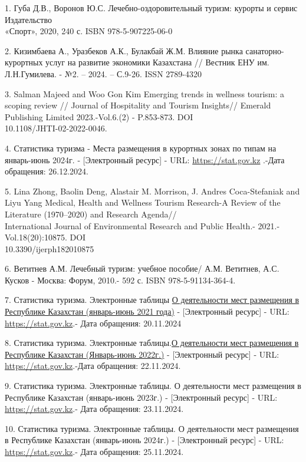\begin{references}
1. Губа Д.В., Воронов Ю.С. Лечебно-оздоровительный туризм: курорты и
сервис Издательство \\«Спорт», 2020, 240 с. ISBN 978-5-907225-06-0~

2. Кизимбаева А., Уразбеков А.К., Булакбай Ж.М. Влияние рынка
санаторно-курортных услуг на развитие экономики Казахстана // Вестник
ЕНУ им. Л.Н.Гумилева. - №2. -- 2024. -- С.9-26. ISSN 2789-4320

3. Salman Majeed and Woo Gon Kim Emerging trends in wellness tourism: a
scoping review // Journal of Hospitality and Tourism Insights// Emerald
Publishing Limited 2023.-Vol.6.(2) - P.853-873. DOI\\
10.1108/JHTI-02-2022-0046.

4. Статистика туризма - Места размещения в курортных зонах по типам на
январь-июнь 2024г. - {[}Электронный ресурс{]} - URL:
\href{https://stat.gov.kz/ru/industries/business-statistics/stat-tourism/}{https://stat.gov.kz}
.-Дата обращения: 26.12.2024.

5. Lina Zhong, Baolin Deng, Alastair M. Morrison, J. Andres
Coca-Stefaniak and Liyu Yang Medical, Health and Wellness Tourism
Research-A Review of the Literature (1970--2020) and Research
Agenda//\\International Journal of Environmental Research and Public
Health.- 2021.- Vol.18(20):10875. DOI \\10.3390/ijerph182010875

6. Ветитнев А.М. Лечебный туризм: учебное пособие/ А.М. Ветитнев, А.С.
Кусков - Москва: Форум, 2010.- 592 с. ISBN 978-5-91134-364-4.

7. Статистика туризма. Электронные таблицы
\href{https://stat.gov.kz/api/iblock/element/26608/file/ru/}{О
деятельности мест размещения в Республике Казахстан (январь-июнь 2021
года)} - {[}Электронный ресурс{]} - URL:
\href{https://stat.gov.kz/ru/industries/business-statistics/stat-tourism/spreadsheets/?year=2021&name}{https://stat.gov.kz}.-
Дата обращения: 20.11.2024

8. Статистика туризма. Электронные
таблицы.\href{https://stat.gov.kz/api/iblock/element/4430/file/ru/}{О
деятельности мест размещения в Республике Казахстан (Январь-июнь
2022г.)} - {[}Электронный ресурс{]} - URL:
\href{https://stat.gov.kz/ru/industries/business-statistics/stat-ourism/spreadsheets/?year=2022&name}{https://stat.gov.kz}.-Дата
обращения: 22.11.2024.

9. Статистика туризма. Электронные таблицы. О деятельности мест
размещения в Республике Казахстан (январь-июнь 2023г.) - {[}Электронный
ресурс{]} - URL:
\href{https://stat.gov.kz/ru/industries/business-statistics/stat-tourism/spreadsheets/?year=2023&name}{https://stat.gov.kz}.-
Дата обращения: 23.11.2024.

10. Статистика туризма. Электронные таблицы. О деятельности мест
размещения в Республике Казахстан (январь-июнь 2024г.) - {[}Электронный
ресурс{]} - URL:
\href{https://stat.gov.kz/ru/industries/business-statistics/stat-tourism/spreadsheets/?year=2024&name}{https://stat.gov.kz}.-
Дата обращения: 25.11.2024.
\end{references}

